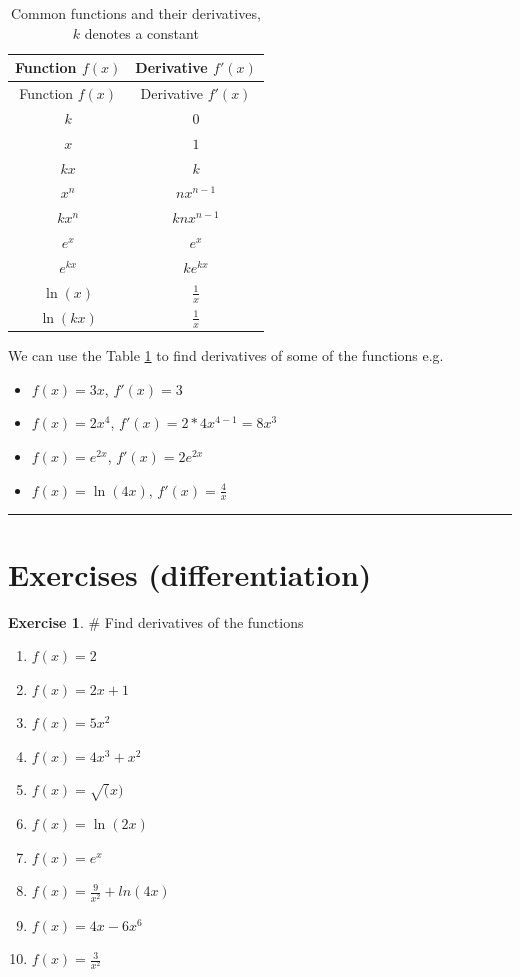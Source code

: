 \documentclass[
]{book}
\providecommand{\tightlist}{%
  \setlength{\itemsep}{0pt}\setlength{\parskip}{0pt}}
\theoremstyle{definition}
\theoremstyle{definition}
\theoremstyle{definition}
\newtheorem{exercise}{Exercise}[chapter]
\theoremstyle{remark}
\begin{document}
\begin{longtable}[]{@{}cc@{}}
\caption{\label{tab:diff-table} Common functions and their derivatives, \(k\) denotes a constant}\tabularnewline
\toprule
Function \(f(x)\) & Derivative \(f'(x)\)\tabularnewline
\midrule
\endfirsthead
\toprule
Function \(f(x)\) & Derivative \(f'(x)\)\tabularnewline
\midrule
\endhead
\(k\) & \(0\)\tabularnewline
\(x\) & \(1\)\tabularnewline
\(kx\) & \(k\)\tabularnewline
\(x^n\) & \(nx^{n-1}\)\tabularnewline
\(kx^n\) & \(knx^{n-1}\)\tabularnewline
\(e^x\) & \(e^x\)\tabularnewline
\(e^{kx}\) & \(ke^{kx}\)\tabularnewline
\(\ln(x)\) & \(\frac{1}{x}\)\tabularnewline
\(\ln(kx)\) & \(\frac{1}{x}\)\tabularnewline
\bottomrule
\end{longtable}

We can use the Table \ref{tab:diff-table} to find derivatives of some of the functions e.g.

\begin{itemize}
\tightlist
\item
  \(f(x) = 3x\), \(f'(x) = 3\)
\item
  \(f(x) = 2x^4\), \(f'(x) = 2*4x^{4-1} = 8x^3\)
\item
  \(f(x) = e^{2x}\), \(f'(x) = 2e^{2x}\)
\item
  \(f(x) = \ln(4x)\), \(f'(x) = \frac{4}{x}\)
\end{itemize}

\begin{center}\rule{0.5\linewidth}{0.5pt}\end{center}

\hypertarget{exercises-differentiation}{%
\section{Exercises (differentiation)}\label{exercises-differentiation}}

\begin{exercise}
\protect\hypertarget{exr:m-diff}{}{\label{exr:m-diff} }
\# Find derivatives of the functions

\begin{enumerate}
\def\labelenumi{\alph{enumi})}
\tightlist
\item
  \(f(x) = 2\)
\item
  \(f(x) = 2x + 1\)
\item
  \(f(x) = 5x^2\)
\item
  \(f(x) = 4x^3 + x^2\)
\item
  \(f(x) = \sqrt(x)\)
\item
  \(f(x) = \ln(2x)\)
\item
  \(f(x) = e^{x}\)
\item
  \(f(x) = \frac{9}{x^2} + ln(4x)\)
\item
  \(f(x) = 4x−6x^6\)
\item
  \(f(x) = \frac{3}{x^2}\)
\end{enumerate}
\end{exercise}
\end{document}
